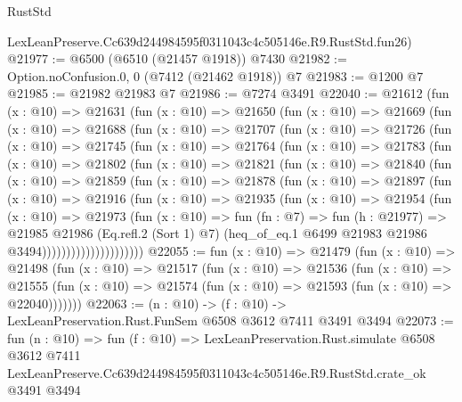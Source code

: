 \begin{lexlean}{RustStd}
\begin{coremodule}
    LexLeanPreserve.Cc639d244984595f0311043c4c505146e.R9.RustStd.fun26)
@21977 := @6500 (@6510 (@21457 @1918)) @7430
@21982 := Option.noConfusion.{0, 0} (@7412 (@21462 @1918)) @7
@21983 := @1200 @7
@21985 := @21982 @21983 @7
@21986 := @7274 @3491
@22040 := @21612
    (fun (x : @10) =>
    @21631
      (fun (x : @10) =>
      @21650
        (fun (x : @10) =>
        @21669
          (fun (x : @10) =>
          @21688
            (fun (x : @10) =>
            @21707
              (fun (x : @10) =>
              @21726
                (fun (x : @10) =>
                @21745
                  (fun (x : @10) =>
                  @21764
                    (fun (x : @10) =>
                    @21783
                      (fun (x : @10) =>
                      @21802
                        (fun (x : @10) =>
                        @21821
                          (fun (x : @10) =>
                          @21840
                            (fun (x : @10) =>
                            @21859
                              (fun (x : @10) =>
                              @21878
                                (fun (x : @10) =>
                                @21897
                                  (fun (x : @10) =>
                                  @21916
                                    (fun (x : @10) =>
                                    @21935
                                      (fun (x : @10) =>
                                      @21954
                                        (fun (x : @10) =>
                                        @21973
                                          (fun (x : @10) =>
                                          fun (fn : @7) =>
                                          fun (h : @21977) =>
                                          @21985
                                            @21986
                                            (Eq.refl.{2} (Sort 1) @7)
                                            (heq_of_eq.{1}
                                              @6499
                                              @21983
                                              @21986
                                              @3494)))))))))))))))))))))
@22055 := fun (x : @10) =>
  @21479
    (fun (x : @10) =>
    @21498
      (fun (x : @10) =>
      @21517
        (fun (x : @10) =>
        @21536
          (fun (x : @10) =>
          @21555 (fun (x : @10) => @21574 (fun (x : @10) => @21593 (fun (x : @10) => @22040)))))))
@22063 := (n : @10) -> (f : @10) -> LexLeanPreservation.Rust.FunSem @6508 @3612 @7411 @3491 @3494
@22073 := fun (n : @10) =>
  fun (f : @10) =>
  LexLeanPreservation.Rust.simulate
    @6508
    @3612
    @7411
    LexLeanPreserve.Cc639d244984595f0311043c4c505146e.R9.RustStd.crate_ok
    @3491
    @3494
\end{coremodule}
\end{lexlean}
